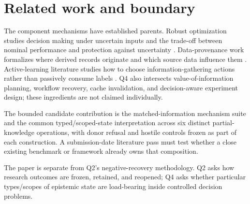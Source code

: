 \section{Related work and boundary}

The component mechanisms have established parents. Robust optimization studies decision making under uncertain inputs and the trade-off between nominal performance and protection against uncertainty \cite{bertsimas2004robustness}. Data-provenance work formalizes where derived records originate and which source data influence them \cite{buneman2001provenance}. Active-learning literature studies how to choose information-gathering actions rather than passively consume labels \cite{settles2009active}. Q4 also intersects value-of-information planning, workflow recovery, cache invalidation, and decision-aware experiment design; these ingredients are not claimed individually.

The bounded candidate contribution is the matched-information mechanism suite and the common typed/scoped-state interpretation across six distinct partial-knowledge operations, with donor refusal and hostile controls frozen as part of each construction. A submission-date literature pass must test whether a close existing benchmark or framework already owns that composition.

The paper is separate from Q2's negative-recovery methodology. Q2 asks how research outcomes are frozen, retained, and reopened; Q4 asks whether particular types/scopes of epistemic state are load-bearing inside controlled decision problems.